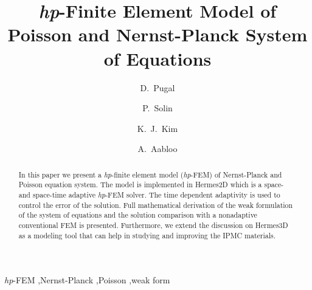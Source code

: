 \documentclass[letterpaper,3p]{elsarticle}
\begin{document}
\begin{frontmatter}

\title{\emph{hp}-Finite Element Model of Poisson and Nernst-Planck System of Equations}

\author[unrme,tartu]{D.~Pugal}

\author[unrmath,czech]{P.~Solin}

\author[unrme]{K.~J.~Kim}

\author[tartu]{A.~Aabloo}

\address[unrme]{Mechanical Engineering Department, University of Nevada, Reno, NV, U.S.A.}
\address[unrmath]{FEM group, Department of Mathematics and Statistics,\\
University of Nevada, Reno, NV, U.S.A.}
\address[czech]{Institute of Thermomechanics, Prague, Czech Republic}
\address[tartu]{Institute of Technology, Tartu University, Estonia}


\begin{abstract}
 In this paper we present a \emph{hp}-finite element
model (\emph{hp}-FEM) of Nernst-Planck and Poisson equation system.
The model is implemented in Hermes2D which is a
space- and space-time adaptive \emph{hp}-FEM solver. The time dependent
adaptivity is used to control the error of the solution. Full mathematical
derivation of the weak formulation of the system of equations and
the solution comparison with a nonadaptive conventional FEM is presented.
Furthermore, we extend the discussion on Hermes3D as a modeling tool that can
help in studying and improving the IPMC materials.
\end{abstract}

\begin{keyword}
  \emph{hp}-FEM \sep Nernst-Planck \sep Poisson \sep weak form
\end{keyword}

\end{frontmatter}








\end{document}
